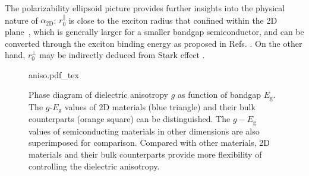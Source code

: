 The polarizability ellipsoid picture provides further insights into
the physical nature of $\alpha_{\mathrm{2D}}$: $r_{0}^{\parallel}$ is
close to the exciton radius that confined within the 2D
plane~\cite{Pulci_2014_exciton}, which is generally larger for a
smaller bandgap semiconductor, and can be converted through the
exciton binding energy as proposed in
Refs. \cite{Olsen_2016_hydrogen,Jiang_2017_Eg_Eb}. On the other hand,
$r_{0}^{\perp}$ may be indirectly deduced from Stark effect
\cite{Pedersen_2016_shark_effect_TMDC,Klein_2016_stark_eff,Roch_2018_stark_eff}.

\begin{figure}[!htbp]
  \centering
  {aniso.pdf_tex}
  \caption{Phase diagram of dielectric anisotropy $g$ as function of
    bandgap $E_{\mathrm{g}}$. The $g$-$E_{\mathrm{g}}$ values of 2D
    materials (blue triangle) and their bulk counterparts (orange
    square) can be distinguished. The $g-E_{\mathrm{g}}$
    values of semiconducting materials in other dimensions are also
    superimposed for comparison.
    Compared with other materials,
    2D materials and their bulk counterparts provide more flexibility
    of controlling the dielectric anisotropy.}
  \label{fig:diele-aniso}
\end{figure}

